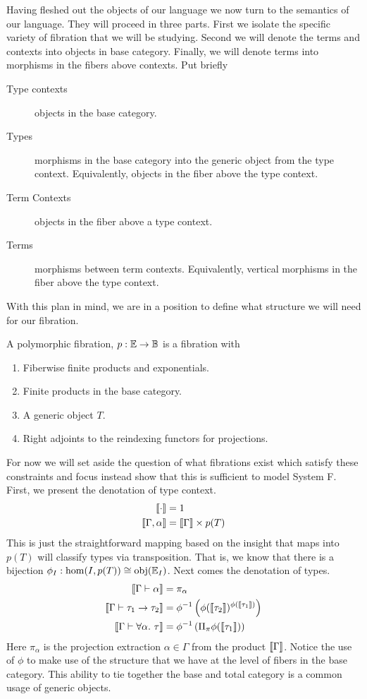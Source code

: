 Having fleshed out the objects of our language we now turn to the
semantics of our language. They will proceed in three parts. First we
isolate the specific variety of fibration that we will be
studying. Second we will denote the terms and contexts into objects in
base category. Finally, we will denote terms into morphisms in the
fibers above contexts. Put briefly
\begin{description}
\item[Type contexts] objects in the base category.
\item[Types] morphisms in the base category into the generic object
  from the type context. Equivalently, objects in the fiber above the
  type context.
\item[Term Contexts] objects in the fiber above a type context.
\item[Terms] morphisms between term contexts. Equivalently, vertical
  morphisms in the fiber above the type context.
\end{description}

With this plan in mind, we are in a position to define what structure
we will need for our fibration.
\begin{defn}\label{defn:systemf:polymorphicfibration}
  A polymorphic fibration, $p : \mathbb{E} \to \mathbb{B}$ is a fibration with
  \begin{enumerate}
  \item Fiberwise finite products and exponentials.
  \item Finite products in the base category.
  \item A generic object $T$.
  \item Right adjoints to the reindexing functors for projections.
  \end{enumerate}
\end{defn}
For now we will set aside the question of what fibrations exist which
satisfy these constraints and focus instead show that this is
sufficient to model System F. First, we present the denotation of
type context.
\begin{align*}
  \llbracket \cdot \rrbracket &= 1\\
  \llbracket \Gamma, \alpha \rrbracket &= \llbracket \Gamma \rrbracket \times p(T)
\end{align*}
This is just the straightforward mapping based on the insight that
maps into $p(T)$ will classify types via transposition. That is, we
know that there is a bijection
$\phi_I : \hom(I, p(T)) \cong \operatorname{obj}(\mathbb{E}_I)$.  Next comes the denotation
of types.
\begin{align*}
  \llbracket \Gamma \vdash \alpha \rrbracket &= \pi_{\alpha}\\
  \llbracket \Gamma \vdash \tau_1 \to \tau_2 \rrbracket &=
  \phi^{-1}\left( \phi(\llbracket \tau_2 \rrbracket)^{\phi(\llbracket \tau_1 \rrbracket)}\right)\\
  \llbracket \Gamma \vdash \forall \alpha.\ \tau \rrbracket &=
  \phi^{-1}\left(\Pi_{\pi}\phi(\llbracket \tau_1 \rrbracket)\right)
\end{align*}
Here $\pi_{\alpha}$ is the projection extraction $\alpha \in \Gamma$
from the product $\llbracket \Gamma \rrbracket$. Notice the use of $\phi$ to make
use of the structure that we have at the level of fibers in the base
category. This ability to tie together the base and total category is
a common usage of generic objects.
